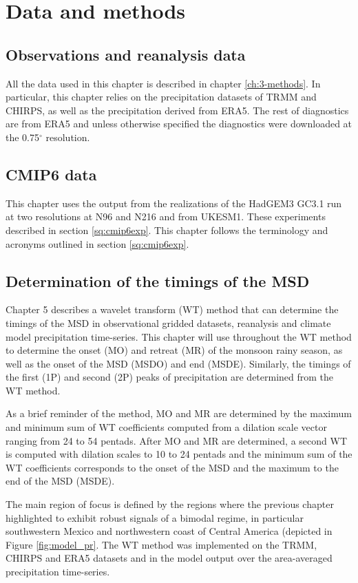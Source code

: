 \section{Data and methods}

\subsection{Observations and reanalysis data}

All the data used in this chapter is described in chapter \ref{ch:3-methods}. In particular, this chapter relies on the precipitation datasets of TRMM and CHIRPS, as well as the precipitation derived from ERA5. The rest of diagnostics are from ERA5 and unless otherwise specified the diagnostics were downloaded at the 0.75$^\circ$ resolution.

\subsection{CMIP6 data}

This chapter uses the output from the realizations of the HadGEM3 GC3.1 run at two resolutions at N96 and N216 and from UKESM1. These experiments described in section \ref{sq:cmip6exp}. This chapter follows the terminology and acronyms outlined in section \ref{sq:cmip6exp}. 

\subsection{Determination of the timings of the MSD}
Chapter 5 describes a wavelet transform (WT) method that can determine the timings of the MSD in observational gridded datasets, reanalysis and climate model precipitation time-series. 
This chapter will use throughout the WT method to determine the onset (MO) and retreat (MR) of the monsoon rainy season, as well as the onset of the MSD (MSDO) and end (MSDE). Similarly, the timings of the first (1P) and second (2P) peaks of precipitation are determined from the WT method. 

As a brief reminder of the method, MO and MR are determined by the maximum and minimum sum of WT coefficients computed from a dilation scale vector ranging from 24 to 54 pentads. After MO and MR are determined, a second WT is computed with dilation scales to 10 to 24 pentads and the minimum sum of the WT coefficients corresponds to the onset of the MSD and the maximum to the end of the MSD (MSDE). 

The main region of focus is defined by the regions where the previous chapter highlighted to exhibit robust signals of a bimodal regime, in particular southwestern Mexico and northwestern coast of Central America (depicted in Figure \ref{fig:model_pr}. The WT method was implemented on the TRMM, CHIRPS and ERA5 datasets and in the model output over the area-averaged precipitation time-series. 

